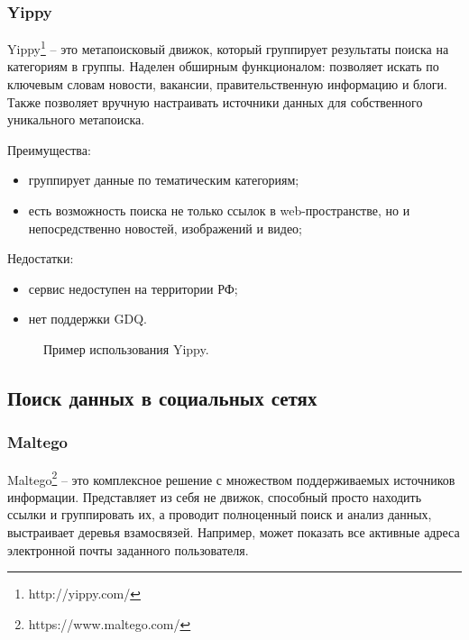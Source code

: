 \subsubsection{Yippy}
Yippy\footnote{http://yippy.com/} -- это метапоисковый движок, который группирует результаты поиска на категориям в группы.
Наделен обширным функционалом: позволяет искать по ключевым словам новости, вакансии, правительственную информацию и блоги.
Также позволяет вручную настраивать источники данных для собственного уникального метапоиска. \cite{yippywikipedia}

Преимущества:
\begin{itemize}
    \item группирует данные по тематическим категориям;
    \item есть возможность поиска не только ссылок в web-пространстве, но и непосредственно новостей, изображений и видео;
\end{itemize}

Недостатки:
\begin{itemize}
    \item сервис недоступен на территории РФ;
    \item нет поддержки GDQ.
\end{itemize}

\begin{figure}[H]
    \caption{Пример использования Yippy.}
    \label{ris:image}
\end{figure}

\subsection{Поиск данных в социальных сетях}
\subsubsection{Maltego}
Maltego\footnote{https://www.maltego.com/} -- это комплексное решение с множеством поддерживаемых источников информации.
Представляет из себя не движок, способный просто находить ссылки и группировать их, а проводит полноценный поиск и анализ
данных, выстраивает деревья взамосвязей. Например, может показать все активные адреса электронной почты заданного пользователя.
\cite{maltegohabr}

